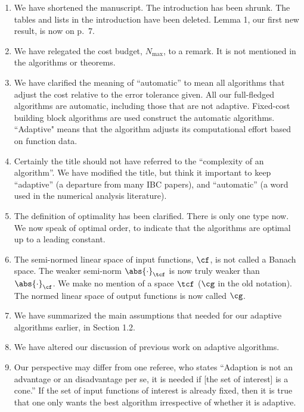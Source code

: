 \documentclass[11pt]{article}
\newcommand{\Fnorm}[1]{\abs{#1}_{\cf}}
\newcommand{\Ftnorm}[1]{\abs{#1}_{\tcf}}
\begin{document}
\begin{enumerate}
\renewcommand{\labelenumi}{\arabic{enumi}.}

\item We have shortened the manuscript.  The introduction has been shrunk. The tables and lists in the introduction have been deleted.  Lemma 1, our first new result, is now on p.\ 7.  

\item We have relegated the cost budget, $N_{\max}$, to a remark.  It is not mentioned in the algorithms or theorems.

\item We have clarified the meaning of ``automatic'' to mean all algorithms that adjust the cost relative to the error tolerance given.  All our full-fledged algorithms are automatic, including those that are not adaptive.  Fixed-cost building block algorithms are used construct the automatic algorithms.  ``Adaptive" means that the algorithm adjusts its computational effort based on function data.

\item Certainly the title should not have referred to the ``complexity of an algorithm''.  We have modified the title, but think it important to keep ``adaptive'' (a departure from many IBC papers), and ``automatic'' (a word used in the numerical analysis literature).

\item The definition of optimality has been clarified.  There is only one type now.  We now speak of optimal order, to indicate that the algorithms are optimal up to a leading constant.

\item The semi-normed linear space of input functions, $\cf$, is not called a Banach space.  The weaker semi-norm $\Ftnorm{\cdot}$ is now truly weaker than $\Fnorm{\cdot}$.  We make no mention of a space $\tcf$ ($\cg$ in the old notation).  The normed linear space of output functions is now called $\cg$.

\item We have summarized the main assumptions that needed for our adaptive algorithms earlier, in Section 1.2.

\item We have altered our discussion of previous work on adaptive algorithms.

\item Our perspective may differ from one referee, who states ``Adaption is not an advantage or an disadvantage per se, it is needed if [the set of interest] is a cone.'' If the set of input functions of interest is already fixed, then it is true that one only wants the best algorithm irrespective of whether it is adaptive.  


\end{enumerate}
\end{document}
